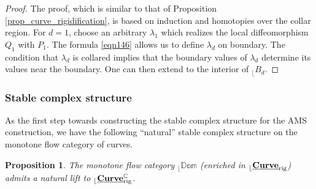 \documentclass[reqno, 10pt]{amsart}
\numberwithin{equation}{section}
\numberwithin{equation}{section}
\newtheorem{prop}[thm]{Proposition}
\theoremstyle{definition}
\theoremstyle{remark}
\newcommand{\mb}{\mathbb}
\renewcommand{\outer}{{}_{\lfloor}}
\newcommand{\uds}[1]{\underline{\smash{#1}}}
\begin{document}
\begin{proof}
The proof, which is similar to that of Proposition \ref{prop_curve_rigidification}, is based on induction and homotopies over the collar region. For $d = 1$, choose an arbitrary $\lambda_1$ which realizes the local diffeomorphism $Q_1$ with $P_1$. The formula \eqref{eqn146} allows us to define $\lambda_d$ on boundary. The condition that $\lambda_d$ is collared implies that the boundary values of $\lambda_d$ determine its values near the boundary. One can then extend to the interior of $\outer B_d$. 
\end{proof}















\subsubsection{Stable complex structure}


As the first step towards constructing the stable complex structure for the AMS construction, we have the following ``natural'' stable complex structure on the monotone flow category of curves. 

\begin{prop}\label{prop_domain_stable_complex}
The monotone flow category $\outer {\mb{Dom}}$ (enriched in $\outer \uds{\bf Curve}_{\rm rig}$) admits a natural lift to $\outer \uds{\bf Curve}_{\rm rig}^{\mb{C}}$.
\end{prop}
\end{document}
